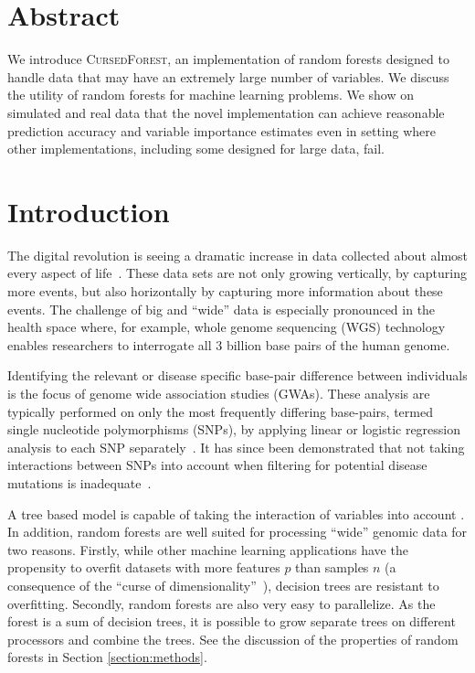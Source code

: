 \documentclass[10pt,letterpaper]{article}
\newcommand{\cursedforest}{\textsc{CursedForest}\xspace}
\begin{document}
\tableofcontents
\clearpage

\section{Abstract}
We introduce \cursedforest, an implementation of random forests designed to handle data that may have an extremely large
number of variables. We discuss the utility of random forests for machine learning problems. We show on simulated and
real data that the novel implementation can achieve reasonable prediction accuracy and variable importance estimates
even in setting where other implementations, including some designed for large data, fail.

\linenumbers

\section{Introduction}
The digital revolution is seeing a dramatic increase in data collected about almost every aspect of
life~\cite{Loebbecke2015}.  These data sets are not only growing vertically, by capturing more events, but also
horizontally by capturing more information about these events.  The challenge of big and ``wide'' data is especially
pronounced in the health space where, for example, whole genome sequencing (WGS) technology enables researchers to
interrogate all 3 billion base pairs of the human genome.

Identifying the relevant or disease specific base-pair difference between individuals is the focus of genome wide
association studies (GWAs).  These analysis are typically performed on only the most frequently differing base-pairs,
termed single nucleotide polymorphisms (SNPs), by applying linear or logistic regression analysis to each SNP
separately~\cite{CCC2007}.  It has since been demonstrated that not taking interactions between SNPs into account
when filtering for potential disease mutations is inadequate~\cite{Manolio2009,Yang2011}.

A tree based model is capable of taking the interaction of variables into account \cite{Wright.et.al.2016}. In addition, random forests are well
suited for processing ``wide'' genomic data for two reasons.  Firstly, while other machine learning applications have
the propensity to overfit datasets with more features $p$ than samples $n$ (a consequence of the ``curse of
dimensionality''~\cite{Bauer2014, bellman1961adaptive}), decision trees are resistant to overfitting.  Secondly, random
forests are also very easy to parallelize. As the forest is a sum of decision trees, it is possible to grow separate
trees on different processors and combine the trees. See the discussion of the properties of random forests in Section
\ref{section:methods}.
\end{document}

